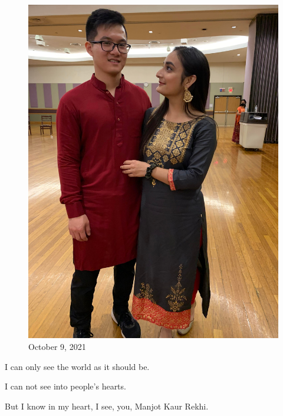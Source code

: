 \documentclass[
]{book}
\begin{document}
\begin{figure}
\centering
\includegraphics[width=5.20833in,height=\textheight]{mimages/13.3 10-9-2021.jpg}
\caption{October 9, 2021}
\end{figure}

I can only see the world as it should be.

I can not see into people's hearts.

But I know in my heart, I see, you, Manjot Kaur Rekhi.
\end{document}
